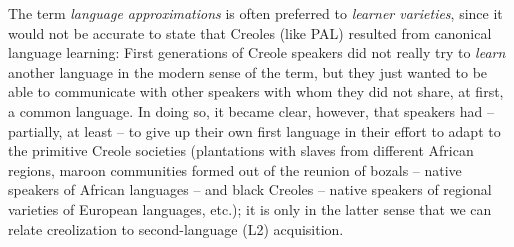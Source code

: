 \documentclass[output=paper,colorlinks,citecolor=brown]{langscibook}
\begin{document}
The term \textit{language approximations} \citep{Chaudenson2003} is often preferred to \textit{learner varieties}, since it would not be accurate to state that Creoles (like PAL) resulted from canonical language learning: First generations of Creole speakers did not really try to \textit{learn} another language in the modern sense of the term, but they just wanted to be able to communicate with other speakers with whom they did not share, at first, a common language. In doing so, it became clear, however, that speakers had – partially, at least – to give up their own first language in their effort to adapt to the primitive Creole societies (plantations with slaves from different African regions, maroon communities formed out of the reunion of bozals -- native speakers of African languages -- and black Creoles -- native speakers of regional varieties of European languages, etc.); it is only in the latter sense that we can relate creolization to second-language (L2) acquisition. 
\end{document}
